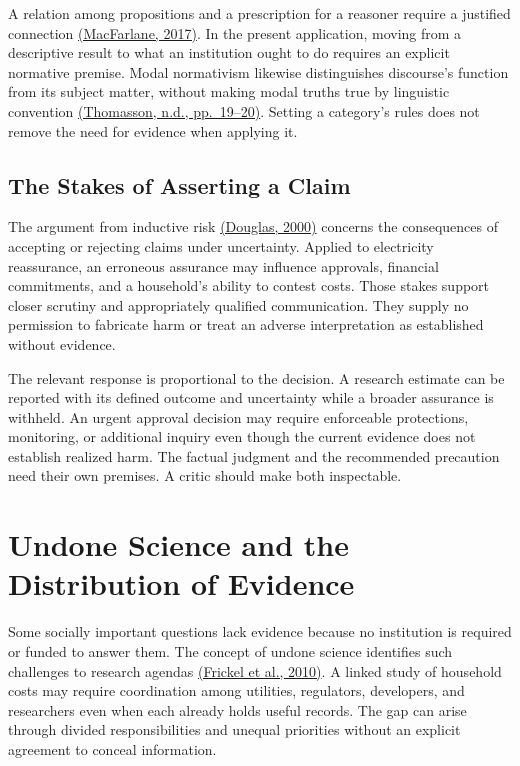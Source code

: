 A relation among propositions and a prescription for a reasoner require
a justified connection
\href{https://johnmacfarlane.net/normative.pdf}{(MacFarlane, 2017)}. In
the present application, moving from a descriptive result to what an
institution ought to do requires an explicit normative premise. Modal
normativism likewise distinguishes discourse's function from its subject
matter, without making modal truths true by linguistic convention
\href{https://www.amiethomasson.org/_files/ugd/63fc8a_924e5fc0c3224895948994030f976cdb.pdf}{(Thomasson,
n.d., pp.~19--20)}. Setting a category's rules does not remove the need
for evidence when applying it.

\hypertarget{M09-the-stakes-of-asserting-a-claim}{%
\subsection{The Stakes of Asserting a
Claim}\label{M09-the-stakes-of-asserting-a-claim}}

\noindent \noindent The argument from inductive risk
\href{https://www.stephanieruphy.com/wp-content/uploads/2020/10/Douglas-2000.pdf}{(Douglas,
2000)} concerns the consequences of accepting or rejecting claims under
uncertainty. Applied to electricity reassurance, an erroneous assurance
may influence approvals, financial commitments, and a household's
ability to contest costs. Those stakes support closer scrutiny and
appropriately qualified communication. They supply no permission to
fabricate harm or treat an adverse interpretation as established without
evidence.

The relevant response is proportional to the decision. A research
estimate can be reported with its defined outcome and uncertainty while
a broader assurance is withheld. An urgent approval decision may require
enforceable protections, monitoring, or additional inquiry even though
the current evidence does not establish realized harm. The factual
judgment and the recommended precaution need their own premises. A
critic should make both inspectable.


\hypertarget{M09-undone-science-and-the-distribution-of-evidence}{%
\section{Undone Science and the Distribution of
Evidence}\label{M09-undone-science-and-the-distribution-of-evidence}}

\noindent \noindent Some socially important questions lack evidence because no
institution is required or funded to answer them. The concept of undone
science identifies such challenges to research agendas
\href{https://www.researchgate.net/publication/249623643_Undone_Science_Charting_Social_Movement_and_Civil_Society_Challenges_to_Research_Agenda_Setting}{(Frickel
et al., 2010)}. A linked study of household costs may require
coordination among utilities, regulators, developers, and researchers
even when each already holds useful records. The gap can arise through
divided responsibilities and unequal priorities without an explicit
agreement to conceal information.


